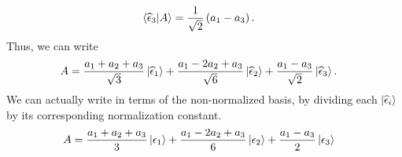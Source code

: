 \documentclass[10pt]{mypackage}
\newcommand{\ep}{\epsilon}
\begin{document}
\begin{example}
\begin{align*}
    \braket{\widehat{\ep}_{3}}{A} &= \frac{1}{\sqrt{2}} \left(a_1 - a_3\right).
  \end{align*}
  Thus, we can write
  \begin{align*}
    A &= \frac{a_1 + a_2 + a_3}{\sqrt{3}}\ket{\widehat{\ep}_{1}} + \frac{a_1 - 2a_2 + a_3}{\sqrt{6}}\ket{\widehat{\ep}_{2}} + \frac{a_1 - a_3}{\sqrt{2}}\ket{\widehat{\ep}_{3}}.
  \end{align*}
  We can actually write in terms of the non-normalized basis, by dividing each $\ket{\widehat{\ep}_{i}}$ by its corresponding normalization constant.
  \begin{align*}
    A &= \frac{a_1 + a_2 + a_3}{3}\ket{\ep_{1}} + \frac{a_1 - 2a_2 + a_3}{6}\ket{\ep_{2}} + \frac{a_1 - a_3}{2}\ket{\ep_{3}}
  \end{align*}
\end{example}
\end{document}
